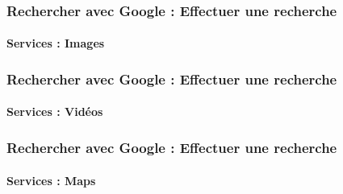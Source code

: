 \documentclass[xcolor=table]{beamer}
\begin{document}
\begin{frame}
\frametitle{Rechercher avec Google : Effectuer une recherche}
\framesubtitle{Services : Images}

\begin{center}
\end{center}

\end{frame}

\begin{frame}
\frametitle{Rechercher avec Google : Effectuer une recherche}
\framesubtitle{Services : Vidéos}

\begin{center}
\end{center}

\end{frame}

\begin{frame}
\frametitle{Rechercher avec Google : Effectuer une recherche}
\framesubtitle{Services : Maps}

\begin{center}
\end{center}

\end{frame}
\end{document}
